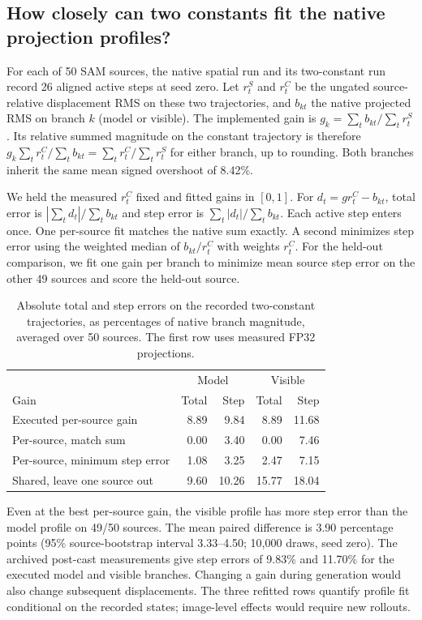 \subsection{How closely can two constants fit the native projection profiles?}
\label{sec:v21-constants}
For each of 50 SAM sources, the native spatial run and its two-constant run record 26 aligned active steps at seed zero. Let $r^S_t$ and $r^C_t$ be the ungated source-relative displacement RMS on these two trajectories, and $b_{kt}$ the native projected RMS on branch $k$ (model or visible). The implemented gain is $g_k=\sum_t b_{kt}/\sum_t r^S_t$. Its relative summed magnitude on the constant trajectory is therefore $g_k\sum_t r^C_t/\sum_t b_{kt}=\sum_t r^C_t/\sum_t r^S_t$ for either branch, up to rounding. Both branches inherit the same mean signed overshoot of 8.42\%.

We held the measured $r^C_t$ fixed and fitted gains in $[0,1]$. For $d_t=g r^C_t-b_{kt}$, total error is $|\sum_t d_t|/\sum_t b_{kt}$ and step error is $\sum_t|d_t|/\sum_t b_{kt}$. Each active step enters once. One per-source fit matches the native sum exactly. A second minimizes step error using the weighted median of $b_{kt}/r^C_t$ with weights $r^C_t$. For the held-out comparison, we fit one gain per branch to minimize mean source step error on the other 49 sources and score the held-out source.

\begin{table}[t]
\centering\small
\caption{Absolute total and step errors on the recorded two-constant trajectories, as percentages of native branch magnitude, averaged over 50 sources. The first row uses measured FP32 projections.}
\label{tab:v21-constants}
\begin{tabular}{@{}lrrrr@{}}
\hline
 & \multicolumn{2}{c}{Model} & \multicolumn{2}{c}{Visible}\\
Gain & Total & Step & Total & Step\\
\hline
Executed per-source gain & 8.89 & 9.84 & 8.89 & 11.68\\
Per-source, match sum & 0.00 & 3.40 & 0.00 & 7.46\\
Per-source, minimum step error & 1.08 & 3.25 & 2.47 & 7.15\\
Shared, leave one source out & 9.60 & 10.26 & 15.77 & 18.04\\
\hline
\end{tabular}
\end{table}

Even at the best per-source gain, the visible profile has more step error than the model profile on 49/50 sources. The mean paired difference is 3.90 percentage points (95\% source-bootstrap interval 3.33--4.50; 10,000 draws, seed zero). The archived post-cast measurements give step errors of 9.83\% and 11.70\% for the executed model and visible branches. Changing a gain during generation would also change subsequent displacements. The three refitted rows quantify profile fit conditional on the recorded states; image-level effects would require new rollouts.
